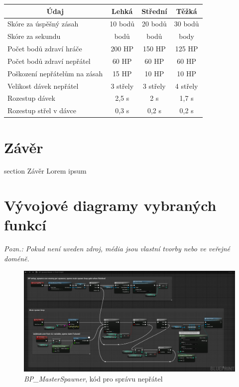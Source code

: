 \documentclass[12pt,a4paper,hidelinks]{article}
\begin{document}
\begin{table}[h!]
\centering
\begin{tabular}{@{}l|ccc@{}}
\toprule
\multicolumn{1}{c|}{\textbf{Údaj}} & \textbf{Lehká} & \textbf{Střední} & \textbf{Těžká} \\ \midrule
Skóre za úspěšný zásah             & 10 bodů        & 20 bodů          & 30 bodů        \\
Skóre za sekundu                   & \textminus5 bodů        & \textminus3 bodů          & \textminus2 body        \\
Počet bodů zdraví hráče            & 200 HP         & 150 HP           & 125 HP         \\
Počet bodů zdraví nepřátel         & 60 HP          & 60 HP            & 60 HP          \\
Poškození nepřátelům na zásah      & 15 HP          & 10 HP            & 10 HP          \\
Velikost dávek nepřátel            & 3 střely       & 3 střely         & 4 střely       \\
Rozestup dávek                     & 2,5 s          & 2 s              & 1,7 s          \\
Rozestup střel v dávce             & 0,3 s          & 0,2 s            & 0,2 s          \\ \bottomrule
\end{tabular}
\end{table}


\clearpage
\section*{Závěr}
 {section} {Závěr}
Lorem ipsum


\clearpage
\appendix
\section{Vývojové diagramy vybraných funkcí}
\textit{Pozn.: Pokud není uveden zdroj, média jsou vlastní tvorby nebo ve veřejné doméně.}
\begin{landscape}
\begin{figure}[h!]
\centering
\includegraphics[width=1.0\linewidth]{images/masterspawner_nodesc.png}
\caption{\textit{BP{\_}MasterSpawner}, kód pro správu nepřátel}
\label{masterspawner}
\end{figure}
\end{landscape}
\clearpage
\end{document}
